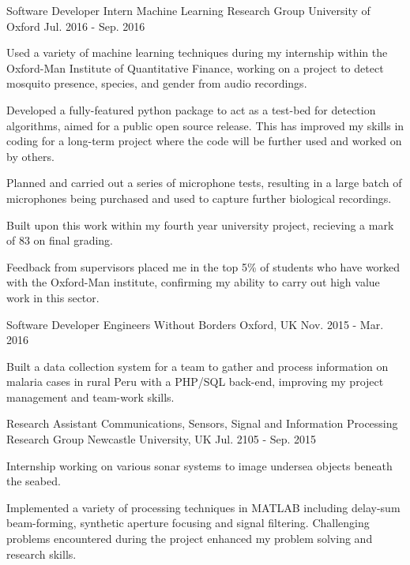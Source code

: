 \begin{cventries}
    \cventry
        {Software Developer Intern}
        {Machine Learning Research Group}
        {University of Oxford}
        {Jul. 2016 - Sep. 2016}
        {
            \begin{cvitems}
                \item{Used a variety of machine learning techniques during my internship within the Oxford-Man Institute of Quantitative Finance, working on a project to detect mosquito presence, species, and gender from audio recordings.}
                \item{Developed a fully-featured python package to act as a test-bed for detection algorithms, aimed for a public open source release. This has improved my skills in coding for a long-term project where the code will be further used and worked on by others.}
                \item{Planned and carried out a series of microphone tests, resulting in a large batch of microphones being purchased and used to capture further biological recordings.}
                \item{Built upon this work within my fourth year university project, recieving a mark of 83 on final grading.}
                \item{Feedback from supervisors placed me in the top 5\% of students who have worked with the Oxford-Man institute, confirming my ability to carry out high value work in this sector.}
            \end{cvitems}
        }


    \cventry
        {Software Developer}
        {Engineers Without Borders}
        {Oxford, UK}
        {Nov. 2015 - Mar. 2016}
        {
            \begin{cvitems}
                \item{Built a data collection system for a team to gather and process information on malaria cases in rural Peru with a PHP/SQL back-end, improving my project management and team-work skills.}
            \end{cvitems}
        }


    \cventry
        {Research Assistant}
        {Communications, Sensors, Signal and Information Processing Research Group}
        {Newcastle University, UK}
        {Jul. 2105 - Sep. 2015}
        {
            \begin{cvitems}
                \item{Internship working on various sonar systems to image undersea objects beneath the seabed.}
                \item{Implemented a variety of processing techniques in MATLAB including delay-sum beam-forming, synthetic aperture focusing and signal filtering. Challenging problems encountered during the project enhanced my problem solving and research skills.}
            \end{cvitems}
        }



\end{cventries}
